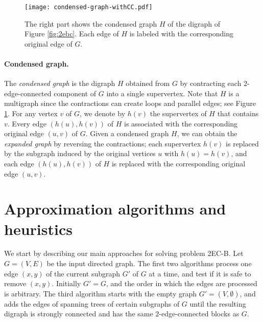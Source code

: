 \documentclass[11pt]{article}
\begin{document}
\begin{figure}[t]
\begin{center}
\texttt{[image: condensed-graph-withCC.pdf]}
\end{center}
\vspace*{-0.1in}
\caption{The right part shows the condensed graph $H$ of the digraph of Figure \ref{fig:2ebc}. Each edge of $H$ is labeled with the corresponding original edge of $G$.}
\label{fig:condensed}
\end{figure}

\paragraph{Condensed graph.} The \emph{condensed graph} is the digraph $H$ obtained from $G$ by contracting each $2$-edge-connected component of $G$ into a single supervertex.
Note that $H$ is a multigraph since the contractions can create loops and parallel edges; see Figure \ref{fig:condensed}.
For any vertex $v$ of $G$, we denote by $h(v)$ the supervertex of $H$ that contains $v$.
Every edge $(h(u),h(v))$ of $H$ is associated with the corresponding original edge $(u,v)$ of $G$.
Given a condensed graph $H$, we can obtain the \emph{expanded graph} by reversing the contractions; each supervertex $h(v)$ is replaced by the subgraph induced by the original vertices $u$ with $h(u)=h(v)$, and each edge $(h(u),h(v))$ of $H$ is replaced with the corresponding original edge $(u,v)$.


\section{Approximation algorithms and heuristics}
\label{sec:algorithms}

We start by describing our main approaches for solving problem
\textsf{2EC-B}. Let $G=(V,E)$ be the input directed graph.
The first two algorithms
process one edge $(x,y)$ of the current subgraph $G'$ of $G$ at a time, and test if it is safe to remove $(x,y)$. Initially $G'=G$, and the order in which the edges are processed is arbitrary. The third algorithm starts with the empty graph $G'=(V,\emptyset)$, and adds the edges of spanning trees of certain subgraphs of $G$ until the resulting digraph is strongly connected and has the same $2$-edge-connected blocks as $G$.
\end{document}
